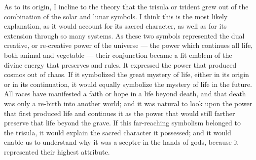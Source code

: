 \documentclass[a4paper, 11pt, oneside, english]{article}
\begin{document}
As to its origin, I incline to the theory that the trisula or trident grew out of the combination of the solar and lunar symbols. I think this is the most likely explanation, as it would account for its sacred character, as well as for its extension through so many systems. As these two symbols represented the dual creative, or re-creative power of the universe --- the power which continues all life, both animal and vegetable --- their conjunction became a fit emblem of the divine energy that preserves and rules. It expressed the power that produced cosmos out of chaos. If it symbolized the great mystery of life, either in its origin or in its continuation, it would equally symbolize the mystery of life in the future. All races have manifested a faith or hope in a life beyond death, and that death was only a re-birth into another world; and it was natural to look upon the power that first produced life and continues it as the power that would still farther preserve that life beyond the grave. If this far-reaching symbolism belonged to the trisula, it would explain the sacred character it possessed; and it would enable us to understand why it was a sceptre in the hands of gods, because it represented their highest attribute.
\end{document}

